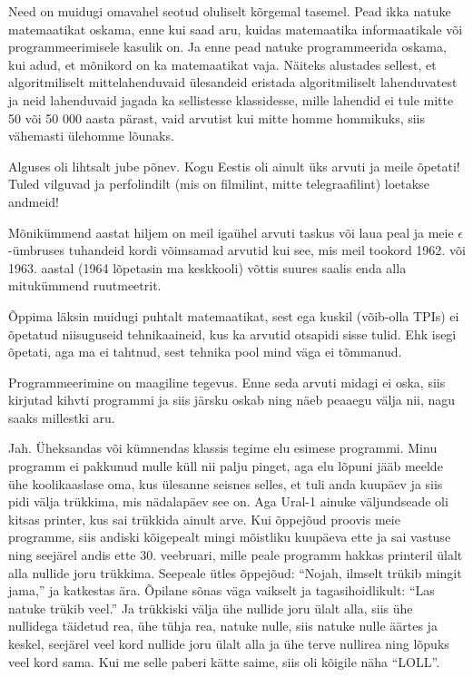 Need on muidugi omavahel seotud oluliselt kõrgemal tasemel. Pead ikka natuke matemaatikat oskama, enne kui saad aru, kuidas matemaatika informaatikale või programmeerimisele kasulik on. Ja 
enne pead natuke programmeerida oskama, kui adud, et mõnikord on ka
matemaatikat vaja. Näiteks alustades sellest, et algoritmiliselt 
mittelahenduvaid ülesandeid eristada algoritmiliselt lahenduvatest ja neid 
lahenduvaid jagada ka sellistesse klassidesse, mille lahendid ei tule mitte 50 
või 50 000 aasta pärast, vaid arvutist kui mitte homme 
hommikuks, siis vähemasti ülehomme lõunaks.


Alguses oli lihtsalt jube põnev. Kogu Eestis oli ainult üks arvuti ja meile 
õpetati! Tuled vilguvad ja perfolindilt (mis on filmilint, mitte 
telegraafilint) loetakse andmeid! 

Mõnikümmend aastat hiljem on meil igaühel arvuti taskus või laua peal ja meie $\epsilon$-ümbruses tuhandeid kordi võimsamad arvutid kui see, mis meil tookord 1962. või 1963. aastal (1964 lõpetasin ma keskkooli) võttis suures 
saalis enda alla mitukümmend ruutmeetrit. 

Õppima läksin muidugi puhtalt matemaatikat, sest ega kuskil (võib-olla TPIs) ei õpetatud niisuguseid 
tehnikaaineid, kus ka arvutid otsapidi sisse tulid. Ehk isegi õpetati, aga ma 
ei tahtnud, sest tehnika pool mind väga ei tõmmanud. 

Programmeerimine on maagiline tegevus. Enne 
seda arvuti midagi ei oska, siis kirjutad kihvti programmi ja 
siis järsku oskab ning näeb peaaegu välja nii, nagu saaks 
millestki aru. 


Jah. Üheksandas või kümnendas klassis tegime elu esimese 
programmi. Minu programm ei pakkunud mulle küll nii palju pinget, aga elu lõpuni 
jääb meelde ühe koolikaaslase oma, kus ülesanne seisnes selles, 
et tuli anda kuupäev ja siis pidi välja trükkima, mis nädalapäev see on. Aga 
Ural-1 ainuke väljundseade oli 
kitsas printer, kus sai trükkida ainult arve. Kui õppejõud proovis 
meie programme, siis andiski kõigepealt mingi mõistliku kuupäeva ette ja sai 
vastuse ning seejärel andis ette 30. veebruari, mille peale programm hakkas 
printeril ülalt alla nullide joru trükkima. Seepeale ütles õppejõud: 
\enquote{Nojah, ilmselt trükib mingit jama,} ja katkestas ära. 
Õpilane sõnas väga vaikselt ja tagasihoidlikult: \enquote{Las natuke trükib veel.} Ja trükkiski välja ühe nullide joru ülalt alla, siis ühe 
nullidega täidetud rea, ühe tühja rea, natuke nulle, siis natuke 
nulle äärtes ja keskel, seejärel veel kord nullide joru 
ülalt alla ja ühe terve nullirea ning lõpuks veel kord sama. Kui me selle 
paberi kätte saime, siis oli kõigile näha \enquote{LOLL}. 

